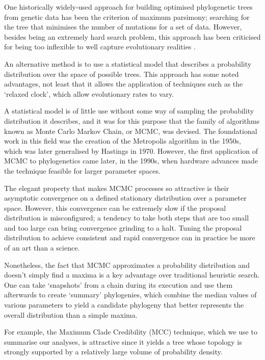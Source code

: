 \documentclass[10pt,journal,compsoc]{IEEEtran}
\begin{document}
One historically widely-used approach for building optimised phylogenetic trees from genetic data has been the criterion of maximum parsimony; searching for the tree that minimises the number of mutations for a set of data. However, besides being an extremely hard search problem, this approach has been criticised for being too inflexible to well capture evolutionary realities \cite{felsenstein2004inferring}.

An alternative method is to use a statistical model that describes a probability distribution over the space of possible trees. This approach has some noted advantages, not least that it allows the application of techniques such as the `relaxed clock', which allow evolutionary rates to vary.

A statistical model is of little use without some way of sampling the probability distribution it describes, and it was for this purpose that the family of algorithms known as Monte Carlo Markov Chain, or MCMC, was devised. The foundational work in this field was the creation of the Metropolis algorithm in the 1950s, which was later generalised by Hastings in 1970\cite{hastings1970monte}. However, the first application of MCMC to phylogenetics came later, in the 1990s, when hardware advances made the technique feasible for larger parameter spaces\cite{ronquist2012mrbayes}.

The elegant property that makes MCMC processes so attractive is their asymptotic convergence on a defined stationary distribution over a parameter space. However, this convergence can be extremely slow if the proposal distribution is misconfigured; a tendency to take both steps that are too small and too large can bring convergence grinding to a halt. Tuning the proposal distribution to achieve consistent and rapid convergence can in practice be more of an art than a science\cite{gilks1996strategies}.

Nonetheless, the fact that MCMC approximates a probability distribution and doesn't simply find a maxima is a key advantage over traditional heuristic search. One can take `snapshots' from a chain during its execution and use them afterwards to create `summary' phylogenies, which combine the median values of various parameters to yield a candidate phylogeny that better represents the overall distribution than a simple maxima\cite{heled2013looking}.

For example, the Maximum Clade Credibility (MCC) technique, which we use to summarise our analyses, is attractive since it yields a tree whose topology is strongly supported by a relatively large volume of probability density.
\end{document}
